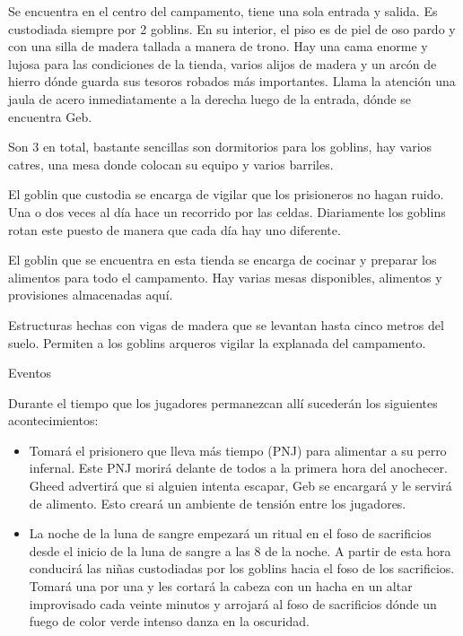 \documentclass[10pt,twoside,twocolumn,openany]{dndbook}
\begin{document}
Se encuentra en el centro del campamento, tiene una sola entrada y salida. Es custodiada siempre por 2 goblins. En su interior, el piso es de piel de oso pardo y con una silla de madera tallada a manera de trono. Hay una cama enorme y lujosa para las condiciones de la tienda, varios alijos de madera y un arcón de hierro dónde guarda sus tesoros robados más importantes. Llama la atención una jaula de acero inmediatamente a la derecha luego de la entrada, dónde se encuentra Geb.

Son 3 en total, bastante sencillas son dormitorios para los goblins, hay varios catres, una mesa donde colocan su equipo y varios barriles.

El goblin que custodia se encarga de vigilar que los prisioneros no hagan ruido. Una o dos veces al día hace un recorrido por las celdas. Diariamente los goblins rotan este puesto de manera que cada día hay uno diferente.

El goblin que se encuentra en esta tienda se encarga de cocinar y preparar los alimentos para todo el campamento. Hay varias mesas disponibles, alimentos y provisiones almacenadas aquí.

Estructuras hechas con vigas de madera que se levantan hasta cinco metros del suelo. Permiten a los goblins arqueros vigilar la explanada del campamento.

\begin{DndComment}{Eventos}

Durante el tiempo que los jugadores permanezcan allí sucederán los siguientes acontecimientos:

\begin{itemize}
  \item Tomará el prisionero que lleva más tiempo (PNJ) para alimentar a su perro infernal. Este PNJ morirá delante de todos a la primera hora del anochecer. Gheed advertirá que si alguien intenta escapar, Geb se encargará y le servirá de alimento. Esto creará un ambiente de tensión entre los jugadores.
  \item La noche de la luna de sangre empezará un ritual en el foso de sacrificios desde el inicio de la luna de sangre a las 8 de la noche. A partir de esta hora conducirá las niñas custodiadas por los goblins hacia el foso de los sacrificios. Tomará una por una y les cortará la cabeza con un hacha en un altar improvisado cada veinte minutos y arrojará al foso de sacrificios dónde un fuego de color verde intenso danza en la oscuridad.
\end{itemize}

\end{DndComment}
\end{document}
